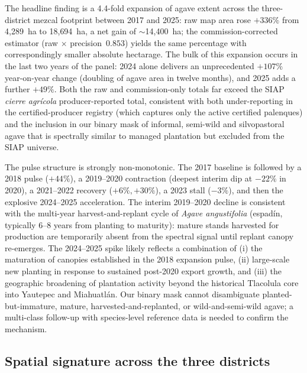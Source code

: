 \documentclass[10pt,a4paper]{article}
\begin{document}
The headline finding is a 4.4-fold expansion of agave extent
across the three-district mezcal footprint between 2017 and 2025:
raw map area rose $+336\%$ from 4{,}289~ha to 18{,}694~ha, a net
gain of $\sim$14{,}400~ha; the commission-corrected estimator
(raw $\times$ precision~$0.853$) yields the same percentage with
correspondingly smaller absolute hectarage. The bulk of this
expansion occurs in the last two years of the panel: 2024 alone
delivers an unprecedented $+107\%$ year-on-year change (doubling
of agave area in twelve months), and 2025 adds a further $+49\%$.
Both the raw and commission-only totals far exceed the SIAP
\textit{cierre agr\'icola} producer-reported total, consistent with
both under-reporting in the certified-producer registry (which
captures only the active certified palenques) and the inclusion in
our binary mask of informal, semi-wild and silvopastoral agave
that is spectrally similar to managed plantation but excluded from
the SIAP universe.

The pulse structure is strongly non-monotonic. The 2017 baseline
is followed by a 2018 pulse ($+44\%$), a 2019--2020 contraction
(deepest interim dip at $-22\%$ in 2020), a 2021--2022 recovery
($+6\%, +30\%$), a 2023 stall ($-3\%$), and then the explosive
2024--2025 acceleration. The interim 2019--2020 decline is
consistent with the multi-year harvest-and-replant cycle of
\textit{Agave angustifolia} (espad\'in, typically 6--8 years from
planting to maturity): mature stands harvested for production are
temporarily absent from the spectral signal until replant canopy
re-emerges. The 2024--2025 spike likely reflects a combination of
(i) the maturation of canopies established in the 2018 expansion
pulse, (ii) large-scale new planting in response to sustained
post-2020 export growth, and (iii) the geographic broadening of
plantation activity beyond the historical Tlacolula core into
Yautepec and Miahuatlán. Our binary mask cannot disambiguate
planted-but-immature, mature, harvested-and-replanted, or
wild-and-semi-wild agave; a multi-class follow-up with
species-level reference data is needed to confirm the mechanism.

\subsection{Spatial signature across the three districts}
\end{document}
